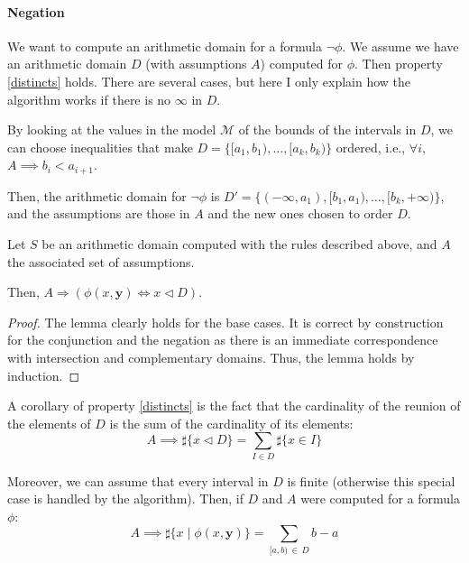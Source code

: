 \paragraph{Negation}
We want to compute an arithmetic domain for a formula $\lnot \phi$. We assume we have an arithmetic
domain $D$ (with assumptions $A$) computed for $\phi$. Then property \ref{distincts} holds. There
are several cases, but here I only explain how the algorithm works if there is no $\infty$ in $D$.

By looking at the values in the model $\mathcal{M}$ of the bounds of the intervals in $D$, we can
choose inequalities that make $D = \{[a_1, b_1), \ldots, [a_k, b_k)\}$ ordered,
i.e., $\forall i$, $A
\implies b_i < a_{i+1}$.

Then, the arithmetic domain for $\lnot \phi$ is $D' = \{(-\infty, a_1), [b_1, a_1), \ldots, [b_k,
+\infty)\}$, and the assumptions are those in $A$ and the new ones chosen to order $D$.


\begin{lemma}[Correctness]

Let $S$ be an arithmetic domain computed with the rules described above, and $A$ the associated set of assumptions.

Then,
$A \Rightarrow \left(\phi(x, \mathbf{y}) \iff x \lhd D\right)$.

\label{correctness-interpretation}

\end{lemma}

\begin{proof}
The lemma clearly holds for the base cases. It is correct by construction for the conjunction and the negation as there is an immediate correspondence with intersection and complementary domains.
Thus, the lemma holds by induction.
\end{proof}




A corollary of property \ref{distincts} is the fact that the cardinality of the reunion of the elements
of $D$ is the sum of the cardinality of its elements:
\begin{equation}
A \implies \sharp\{ x \lhd D \} = \sum\limits_{I \in D} \sharp\{x \in I\}
\end{equation}

Moreover, we can assume that every interval in $D$ is finite (otherwise this
special case is handled by the algorithm). Then, if $D$ and $A$
were computed for a formula $\phi$:
\begin{equation}
A \implies \sharp\{x \mid \phi(x, \mathbf{y})\} = \sum\limits_{[a, b)\, \in\, D} b - a
\end{equation}


